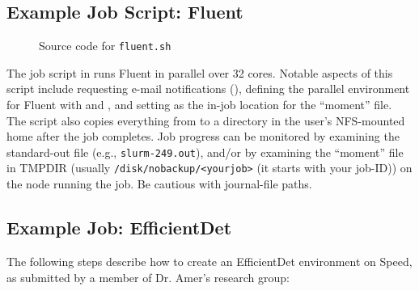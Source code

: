 \subsection{Example Job Script: Fluent}

\begin{figure}[htpb]
  
  \caption{Source code for \texttt{fluent.sh}}
  \label{fig:fluent.sh}
\end{figure}

The job script in  runs Fluent in parallel over 32 cores. 
Notable aspects of this script include requesting e-mail notifications (), 
defining the parallel environment for Fluent with  and , 
and setting  as the in-job location for the ``moment''  file.
The script also copies everything from  to a directory in the user's NFS-mounted home after the job completes.
Job progress can be monitored by examining the standard-out file (e.g.,
\texttt{slurm-249.out}), and/or by examining the ``moment'' file in TMPDIR (usually
\texttt{/disk/nobackup/<yourjob>} (it starts with your job-ID)) on the node running
the job. Be cautious with journal-file paths.

\subsection{Example Job: EfficientDet}

The following steps describe how to create an EfficientDet environment on Speed, 
as submitted by a member of Dr. Amer's research group:

